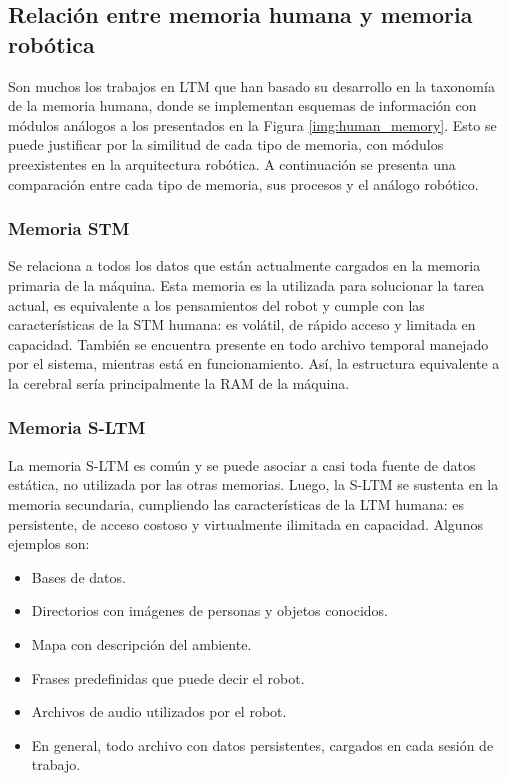 

\subsection{Relación entre memoria humana y memoria robótica}


Son muchos los trabajos en LTM que han basado su desarrollo en la taxonomía de la memoria humana, donde se implementan esquemas de información con módulos análogos a los presentados en la Figura \ref{img:human_memory}. Esto se puede justificar por la similitud de cada tipo de memoria, con módulos preexistentes en la arquitectura robótica. A continuación se presenta una comparación entre cada tipo de memoria, sus procesos y el análogo robótico.

\subsubsection{Memoria STM}

Se relaciona a todos los datos que están actualmente cargados en la memoria primaria de la máquina. Esta memoria es la utilizada para solucionar la tarea actual, es equivalente a los pensamientos del robot y cumple con las características de la STM humana: es volátil, de rápido acceso y limitada en capacidad. También se encuentra presente en todo archivo temporal manejado por el sistema, mientras está en funcionamiento. Así, la estructura equivalente a la cerebral sería principalmente la RAM de la máquina.


\subsubsection{Memoria S-LTM}

La memoria S-LTM es común y se puede asociar a casi toda fuente de datos estática, no utilizada por las otras memorias. Luego, la S-LTM se sustenta en la memoria secundaria, cumpliendo las características de la LTM humana: es persistente, de acceso costoso y virtualmente ilimitada en capacidad. Algunos ejemplos son:
\begin{itemize}[topsep=0pt]
\setlength\itemsep{0.2em}
\item Bases de datos.
\item Directorios con imágenes de personas y objetos conocidos.
\item Mapa con descripción del ambiente.
\item Frases predefinidas que puede decir el robot.
\item Archivos de audio utilizados por el robot.
\item En general, todo archivo con datos persistentes, cargados en cada sesión de trabajo.
\end{itemize}


